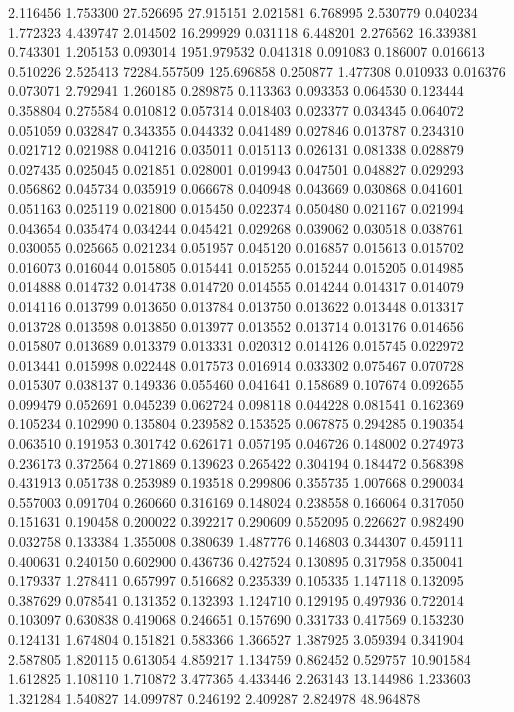 2.116456
1.753300
27.526695
27.915151
2.021581
6.768995
2.530779
0.040234
1.772323
4.439747
2.014502
16.299929
0.031118
6.448201
2.276562
16.339381
0.743301
1.205153
0.093014
1951.979532
0.041318
0.091083
0.186007
0.016613
0.510226
2.525413
72284.557509
125.696858
0.250877
1.477308
0.010933
0.016376
0.073071
2.792941
1.260185
0.289875
0.113363
0.093353
0.064530
0.123444
0.358804
0.275584
0.010812
0.057314
0.018403
0.023377
0.034345
0.064072
0.051059
0.032847
0.343355
0.044332
0.041489
0.027846
0.013787
0.234310
0.021712
0.021988
0.041216
0.035011
0.015113
0.026131
0.081338
0.028879
0.027435
0.025045
0.021851
0.028001
0.019943
0.047501
0.048827
0.029293
0.056862
0.045734
0.035919
0.066678
0.040948
0.043669
0.030868
0.041601
0.051163
0.025119
0.021800
0.015450
0.022374
0.050480
0.021167
0.021994
0.043654
0.035474
0.034244
0.045421
0.029268
0.039062
0.030518
0.038761
0.030055
0.025665
0.021234
0.051957
0.045120
0.016857
0.015613
0.015702
0.016073
0.016044
0.015805
0.015441
0.015255
0.015244
0.015205
0.014985
0.014888
0.014732
0.014738
0.014720
0.014555
0.014244
0.014317
0.014079
0.014116
0.013799
0.013650
0.013784
0.013750
0.013622
0.013448
0.013317
0.013728
0.013598
0.013850
0.013977
0.013552
0.013714
0.013176
0.014656
0.015807
0.013689
0.013379
0.013331
0.020312
0.014126
0.015745
0.022972
0.013441
0.015998
0.022448
0.017573
0.016914
0.033302
0.075467
0.070728
0.015307
0.038137
0.149336
0.055460
0.041641
0.158689
0.107674
0.092655
0.099479
0.052691
0.045239
0.062724
0.098118
0.044228
0.081541
0.162369
0.105234
0.102990
0.135804
0.239582
0.153525
0.067875
0.294285
0.190354
0.063510
0.191953
0.301742
0.626171
0.057195
0.046726
0.148002
0.274973
0.236173
0.372564
0.271869
0.139623
0.265422
0.304194
0.184472
0.568398
0.431913
0.051738
0.253989
0.193518
0.299806
0.355735
1.007668
0.290034
0.557003
0.091704
0.260660
0.316169
0.148024
0.238558
0.166064
0.317050
0.151631
0.190458
0.200022
0.392217
0.290609
0.552095
0.226627
0.982490
0.032758
0.133384
1.355008
0.380639
1.487776
0.146803
0.344307
0.459111
0.400631
0.240150
0.602900
0.436736
0.427524
0.130895
0.317958
0.350041
0.179337
1.278411
0.657997
0.516682
0.235339
0.105335
1.147118
0.132095
0.387629
0.078541
0.131352
0.132393
1.124710
0.129195
0.497936
0.722014
0.103097
0.630838
0.419068
0.246651
0.157690
0.331733
0.417569
0.153230
0.124131
1.674804
0.151821
0.583366
1.366527
1.387925
3.059394
0.341904
2.587805
1.820115
0.613054
4.859217
1.134759
0.862452
0.529757
10.901584
1.612825
1.108110
1.710872
3.477365
4.433446
2.263143
13.144986
1.233603
1.321284
1.540827
14.099787
0.246192
2.409287
2.824978
48.964878
